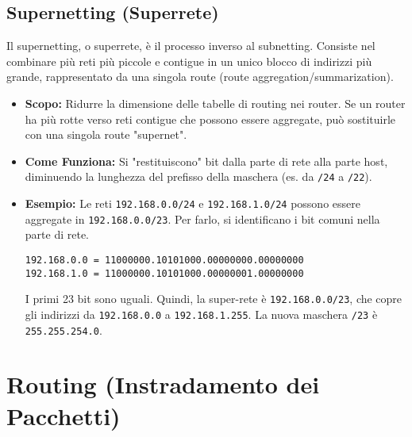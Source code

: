 \subsection{Supernetting (Superrete)}
Il supernetting, o superrete, è il processo inverso al subnetting. Consiste nel combinare più reti più piccole e contigue in un unico blocco di indirizzi più grande, rappresentato da una singola route (route aggregation/summarization).
\begin{itemize}
    \item \textbf{Scopo:} Ridurre la dimensione delle tabelle di routing nei router. Se un router ha più rotte verso reti contigue che possono essere aggregate, può sostituirle con una singola route "supernet".
    \item \textbf{Come Funziona:} Si "restituiscono" bit dalla parte di rete alla parte host, diminuendo la lunghezza del prefisso della maschera (es. da \texttt{/24} a \texttt{/22}).
    \item \textbf{Esempio:} Le reti \texttt{192.168.0.0/24} e \texttt{192.168.1.0/24} possono essere aggregate in \texttt{192.168.0.0/23}.
    Per farlo, si identificano i bit comuni nella parte di rete.
    \begin{verbatim}
192.168.0.0 = 11000000.10101000.00000000.00000000
192.168.1.0 = 11000000.10101000.00000001.00000000
    \end{verbatim}
    I primi 23 bit sono uguali. Quindi, la super-rete è \texttt{192.168.0.0/23}, che copre gli indirizzi da \texttt{192.168.0.0} a \texttt{192.168.1.255}.
    La nuova maschera \texttt{/23} è \texttt{255.255.254.0}.
\end{itemize}

\section{Routing (Instradamento dei Pacchetti)}

